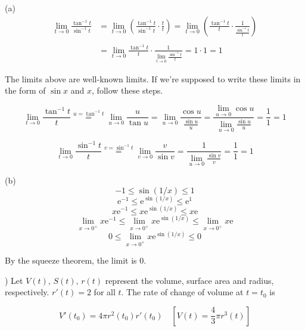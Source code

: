 \documentclass{article}
\begin{document}
\noindent (a)
\begin{align*}
\lim_{t\to 0} \frac{\tan^{-1} t}{\sin^{-1} t}&= \lim_{t\to 0}\left( \frac{\tan^{-1} t}{\sin^{-1}t} \cdot\frac tt\right) = \lim_{t\to 0}\left( \frac{\tan^{-1} t}{t} \cdot\frac1{\frac {\sin^{-1}t}t}\right)\\\\&=\lim_{t\to0}\frac{\tan^{-1}t}t\cdot\frac1{\displaystyle\lim_{t\to 0}\frac{\sin^{-1}t}t}=1\cdot1=\boxed1
\end{align*}

\noindent The limits above are well-known limits. If we're supposed to write these limits in the form of $\sin x$ and $x$, follow these steps.

\[\lim_{t\to0}\frac{\tan^{-1} t}{t}\overset{u=\tan^{-1} t}{=}\lim_{u\to0}\frac u{\tan u} = \lim_{u\to0}\frac{\cos u}{\frac{\sin u}u}=\frac{\displaystyle \lim_{u\to0}\cos u}{\displaystyle\lim_{u\to0}\frac{\sin u}u} = \frac11 = 1\]

\[\lim_{t\to0}\frac{\sin^{-1} t}{t}\overset{v=\sin^{-1} t}{=}\lim_{v\to0}\frac v{\sin v} =\frac1{\displaystyle\lim_{u\to0}\frac{\sin v}v} = \frac11 = 1\]

\hfill

\noindent (b)
\begin{equation*}-1\leq\sin(1/x) \leq 1\end{equation*}
\begin{equation*}\mathrm{e}^{-1}\leq\mathrm{e}^{\sin(1/x)} \leq \mathrm{e}^1\end{equation*}
\begin{equation*}x\mathrm{e}^{-1}\leq x\mathrm{e}^{\sin(1/x)} \leq x\mathrm{e}\end{equation*}
\begin{equation*}\lim_{x\to0^+}x\mathrm{e}^{-1}\leq \lim_{x\to0^+}x\mathrm{e}^{\sin(1/x)} \leq\lim_{x\to0^+}x\mathrm{e}\end{equation*}
\begin{equation*}0\leq \lim_{x\to0^+}x\mathrm{e}^{\sin(1/x)} \leq0\end{equation*}

\hfill

\noindent By the squeeze theorem, the limit is $\boxed{0}$.

\hfill

) Let $V(t),\,S(t),\,r(t)$ represent the volume, surface area and radius, respectively. $r'(t) = 2$ for all $t$. The rate of change of volume at $t=t_0$ is

\[V'(t_0) = 4\pi r^2(t_0)r'(t_0) \quad\left[V(t) = \frac43 \pi r^3(t)\right] \]
\end{document}
